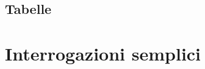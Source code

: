

% 









	
	\afterpage{\blankpage}
	\clearpage


	
	
	\afterpage{\blankpage}
	\clearpage


\begin{center}
	\section*{Tabelle}
\end{center}




\newpage
\section*{Interrogazioni semplici}

